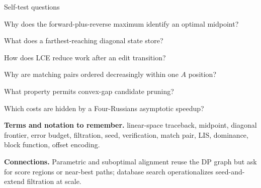 \documentclass[11pt,letterpaper]{article}
\begin{document}
\begin{CornellExamBox}{Self-test questions}
\begin{CornellRecallList}
  \item Why does the forward-plus-reverse maximum identify an optimal midpoint?
  \item What does a farthest-reaching diagonal state store?
  \item How does LCE reduce work after an edit transition?
  \item Why are matching pairs ordered decreasingly within one $A$ position?
  \item What property permits convex-gap candidate pruning?
  \item Which costs are hidden by a Four-Russians asymptotic speedup?
\end{CornellRecallList}
\end{CornellExamBox}

{\footnotesize
\textbf{Terms and notation to remember.} linear-space traceback, midpoint, diagonal frontier, error budget, filtration, seed, verification, match pair, LIS, dominance, block function, offset encoding.

\textbf{Connections.} Parametric and suboptimal alignment reuse the DP graph but ask for score regions or near-best paths; database search operationalizes seed-and-extend filtration at scale.
}
\end{document}
